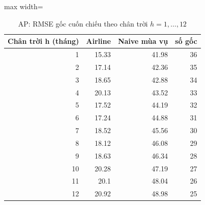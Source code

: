 \begin{table}[H]
\centering\small
\caption{AP: RMSE gốc cuốn chiếu theo chân trời $h=1,\dots,12$}\label{tab:tab_b12_12_ap_rolling_by_horizon}
\begin{adjustbox}{max width=\linewidth}
\begin{tabular}{rrrr}
\toprule
Chân trời h (tháng) & Airline & Naive mùa vụ & số gốc \\
\midrule
1 & 15.33 & 41.98 & 36 \\
2 & 17.14 & 42.36 & 35 \\
3 & 18.65 & 42.88 & 34 \\
4 & 20.13 & 43.52 & 33 \\
5 & 17.52 & 44.19 & 32 \\
6 & 17.24 & 44.88 & 31 \\
7 & 18.52 & 45.56 & 30 \\
8 & 18.12 & 46.08 & 29 \\
9 & 18.63 & 46.34 & 28 \\
10 & 20.28 & 47.19 & 27 \\
11 & 20.1 & 48.04 & 26 \\
12 & 20.92 & 48.98 & 25 \\
\bottomrule
\end{tabular}
\end{adjustbox}
\end{table}
